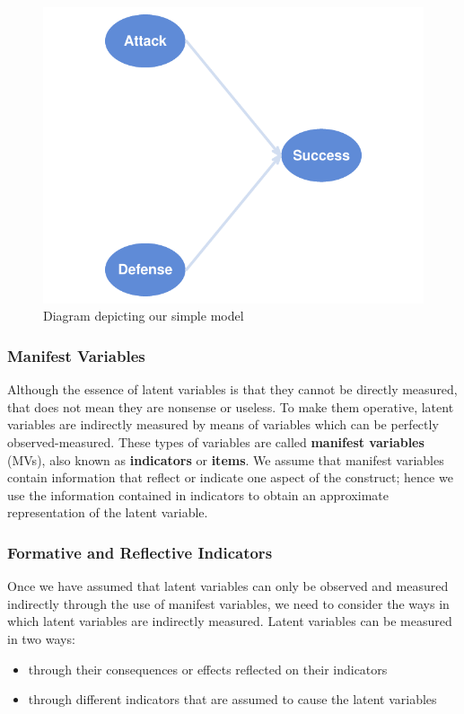 \documentclass[12pt]{book}\usepackage{graphicx, color}
\newenvironment{knitrout}{}{} %
\begin{document}
\begin{knitrout}
\color{fgcolor}\begin{figure}[h]


{\centering \includegraphics[width=.7\linewidth,height=.4\linewidth]{figure/plot_success_diagram} 

}

\caption[Diagram depicting our simple model]{Diagram depicting our simple model\label{fig:plot_success_diagram}}
\end{figure}


\end{knitrout}





\subsubsection*{Manifest Variables}
Although the essence of latent variables is that they cannot be directly measured, that does not mean they are nonsense or useless. To make them operative, latent variables are indirectly measured by means of variables which can be perfectly observed-measured. These types of variables are called \textbf{manifest variables} (MVs), also known as \textbf{indicators} or \textbf{items}. We assume that manifest variables contain information that reflect or indicate one aspect of the construct; hence we use the information contained in indicators to obtain an approximate representation of the latent variable.


\subsubsection*{Formative and Reflective Indicators}
Once we have assumed that latent variables can only be observed and measured indirectly through the use of manifest variables, we need to consider the ways in which latent variables are indirectly measured. Latent variables can be measured in two ways:
\begin{itemize}
 \item through their consequences or effects reflected on their indicators
 \item through different indicators that are assumed to cause the latent variables
\end{itemize}
\end{document}
